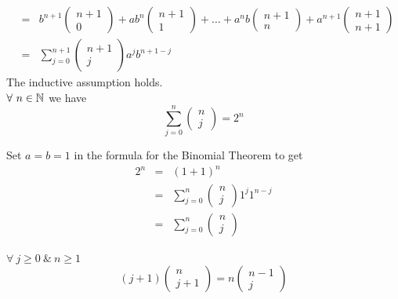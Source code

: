 \documentclass[11pt,a4paper]{article}
\begin{document}
\[\begin{array}{rcl}
&=&b^{n+1}\begin{pmatrix}n+1\\0\end{pmatrix}+ab^n\begin{pmatrix}n+1\\1\end{pmatrix}+\dots+a^nb\begin{pmatrix}n+1\\n\end{pmatrix}+a^{n+1}\begin{pmatrix}n+1\\n+1\end{pmatrix}\\
&=&\sum\limits_{j=0}^{n+1}\begin{pmatrix}n+1\\j\end{pmatrix}a^jb^{n+1-j}
\end{array}\]
The inductive assumption holds.\\

$\forall\ n\in\mathbb{N}$ we have
$$\sum_{j=0}^n\begin{pmatrix}n\\j\end{pmatrix}=2^n$$

Set $a=b=1$ in the formula for the Binomial Theorem to get
\[\begin{array}{rcl}
2^n&=&(1+1)^n\\
&=&\sum\limits_{j=0}^n\begin{pmatrix}n\\j\end{pmatrix}1^j1^{n-j}\\
&=&\sum\limits_{j=0}^n\begin{pmatrix}n\\j\end{pmatrix}
\end{array}\]

$\forall\ j\geq0\ \&\ n\geq1$
$$(j+1)\begin{pmatrix}n\\j+1\end{pmatrix}=n\begin{pmatrix}n-1\\j\end{pmatrix}$$
\end{document}
